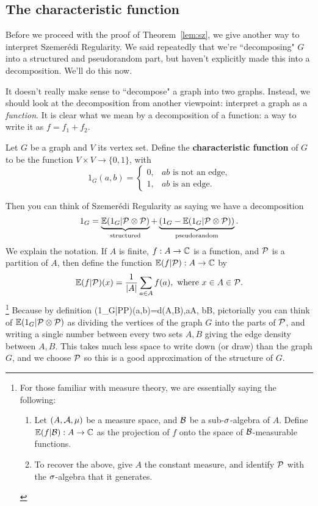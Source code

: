 \subsection{The characteristic function}
Before we proceed with the proof of Theorem~\ref{lem:sz}, we give another way to interpret Szemer\'edi Regularity. We said repeatedly that we're ``decomposing" $G$ into a structured and pseudorandom part, but haven't explicitly made this into a decomposition. We'll do this now.

It doesn't really make sense to ``decompose" a graph into two graphs. Instead, we should look at the decomposition from another viewpoint: interpret a graph as a {\it function}. It is clear what we mean by a decomposition of a function: a way to write it as $f=f_1+f_2$.

\begin{df}
Let $G$ be a graph and $V$ its vertex set. 
Define the \textbf{characteristic function} of $G$ to be the function $V\times V\to \{0,1\}$, with
\[
1_{G}(a,b)=\begin{cases}
0,&ab\text{ is not an edge,}\\
1,&ab\text{ is an edge.}
\end{cases}
\]
\end{df}
Then you can think of Szemer\'edi Regularity as saying we have a decomposition
\[
1_G=\ub{\E(1_G|\cal P\ot \cal P)}{\text{structured}}
+ \ub{(1_G-\E(1_G|\cal P\ot \cal P))}{\text{pseudorandom}}.
\]
We explain the notation. If $A$ is finite, $f:A\to \C$ is a function, and $\cal P$ is a partition of $A$, then define the function $\E(f|\cal P):A\to \C$ by
\[
\E(f|\cal P)(x)=\rc{|A|}\sum_{a\in A} f(a), \text{ where }x\in A\in \cal P.
\]
\footnote{For those familiar with measure theory, we are essentially saying the following:
\begin{enumerate}
\item
Let $(A, \cal A, \mu)$ be a measure space, and $\cal B$ be a sub-$\si$-algebra of $A$. Define $\E(f|\cal B):A\to \C$ as the projection of $f$ onto the space of $\cal B$-measurable functions.
\item
To recover the above, give $A$ the constant measure, and identify $\cal P$ with the $\si$-algebra that it generates.
\end{enumerate}}
Because by definition%
\E(1_G|\cal P\ot \cal P)(a,b)=d(A,B),\qquad a\in A, b\in B,
\eeq
pictorially you can think of $\E(1_G|\cal P\ot \cal P)$ as dividing the vertices of the graph $G$ into the parts of $\cal P$, and writing a single number between every two sets $A,B$ giving the edge density between $A,B$. This takes much less space to write down (or draw) than the graph $G$, and we choose $\cal P$ so this is a good approximation of the structure of $G$.

